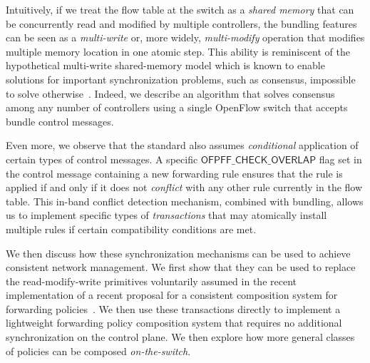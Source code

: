 \documentclass[conference]{sigcomm-alternate}
\begin{document}
Intuitively, if we treat the flow table at the switch as a \emph{shared memory}
that can be concurrently read and modified by multiple controllers, 
the bundling features can be seen as a \emph{multi-write} or, more
widely, \emph{multi-modify} operation that modifies
multiple memory location in one atomic step.
This ability is reminiscent of the hypothetical multi-write
shared-memory model which is known to enable solutions for important
synchronization problems, such as consensus, impossible to solve
otherwise~\cite{multi-objects}. 
Indeed, we describe an algorithm that solves consensus among any
number of controllers using a single OpenFlow switch that accepts
bundle control messages. 
   
Even more, we observe that the standard also assumes \emph{conditional} application of
certain types of control messages. A specific $\textsf{OFPFF}\_\textsf{CHECK}\_\textsf{OVERLAP}$ flag
set in the control message containing a new forwarding rule ensures
that the rule is applied if and only if it does not \emph{conflict}
with any other rule currently in the flow table.  
This in-band conflict detection mechanism, combined with bundling,
allows us to implement specific types of \emph{transactions} that may
atomically install multiple rules if certain compatibility conditions
are met. 

We then discuss how these synchronization mechanisms can be used to
achieve consistent network management. 
We first show that they can be used to replace the read-modify-write
primitives voluntarily assumed in the recent implementation of a
recent proposal for a consistent composition system for forwarding policies~\cite{cpc}.  
We then use these transactions directly to implement a lightweight
forwarding policy composition system that requires no additional
synchronization on the control plane.     
We then explore how more general classes of policies can be composed
\emph{on-the-switch}. 



 

\end{document}
